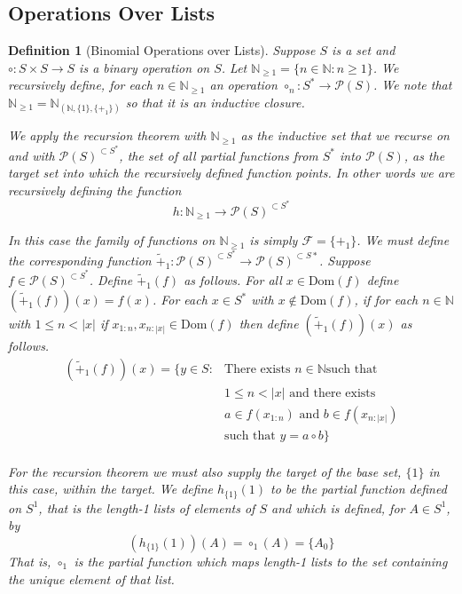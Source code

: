\documentclass[12pt]{article}
\theoremstyle{break}
\newtheorem{definition}{Definition}[section]
\theoremstyle{break}
\theoremstyle{break}
\theoremstyle{break}
\theoremstyle{break}
\newtheorem{informal definition}[definition]{Informal Definition}
\theoremstyle{break}
\newtheorem{informal theorem}[theorem]{Informal Theorem}
\newcommand{\natnum}[0]{\mathbb{N}}
\begin{document}
	\subsection{Operations Over Lists}
	
	\begin{definition}[Binomial Operations over Lists]
		Suppose $S$ is a set and $\circ:S\times S \to S$ is a binary operation on $S$.
		Let $\mathbb{N}_{\ge 1} = \{n \in \mathbb{N}: n \ge 1\}$.
		We recursively define, for each $n\in \mathbb{N}_{\ge 1}$ an operation $\circ_n:S^* \to \mathcal{P}(S)$.
		We note that $\mathbb{N}_{\ge 1} = \mathbb{N}_{(\mathbb{N}, \{1\}, \{+_1\})}$ so that it is an inductive closure.
		
		We apply the recursion theorem with $\mathbb{N}_{\ge 1}$ as the inductive set that we recurse on and with $\mathcal{P}(S)^{\subset S^*}$, the set of all partial functions from $S^*$ into $\mathcal{P}(S)$, as the target set into which the recursively defined function points.
		In other words we are recursively defining the function
		$$
		h: \mathbb{N}_{\ge 1} \to \mathcal{P}(S)^{\subset S^*}
		$$
		
		In this case the family of functions on $\mathbb{N}_{\ge 1}$ is simply $\mathcal{F} = \{+_1\}$.
		We must define the corresponding function $\tilde{+}_1: \mathcal{P}(S)^{\subset S^*} \to \mathcal{P}(S)^{\subset S*}$.
		Suppose $f \in \mathcal{P}(S)^{\subset S^*}$.
		Define $\tilde{+}_1(f)$ as follows.
		For all $x \in \text{Dom}(f)$ define $(\tilde{+}_1(f))(x) = f(x)$.
		For each $x\in S^*$ with $x\not \in \text{Dom}(f)$, if for each $n \in \natnum$ with $1 \le n < |x|$ if $x_{1:n}, x_{n:|x|} \in \text{Dom}(f)$ then define $(\tilde{+}_1(f))(x)$ as follows.
		\begin{align*}
			(\tilde{+}_1(f))(x) = \{y \in S:& \text{There exists } n \in \natnum \text{such that }\\
			& 1 \le n < |x| \text{ and there exists }\\
			& a \in f(x_{1:n}) \text{ and } b \in f(x_{n:|x|})\\
			& \text{such that } y = a \circ b\}\\
		\end{align*}
		
		For the recursion theorem we must also supply the target of the base set, $\{1\}$ in this case, within the target.
		We define $h_{\{1\}}(1)$ to be the partial function defined on $S^1$, that is the length-1 lists of elements of $S$ and which is defined, for $A \in S^1$, by
		$$
		(h_{\{1\}}(1))(A) = \circ_1(A) = \{A_0\}
		$$
		That is, $\circ_1$ is the partial function which maps length-1 lists to the set containing the unique element of that list.
		

\end{definition}
\end{document}
